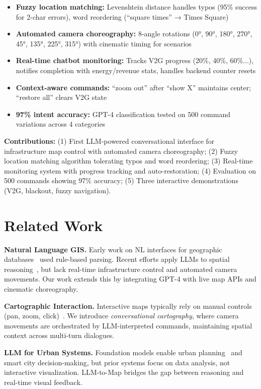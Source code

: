 \documentclass[sigconf]{acmart}
\begin{document}
\begin{itemize}
    \item \textbf{Fuzzy location matching:} Levenshtein distance handles typos (95\% success for 2-char errors), word reordering (``square times'' → Times Square)
    \item \textbf{Automated camera choreography:} 8-angle rotations (0°, 90°, 180°, 270°, 45°, 135°, 225°, 315°) with cinematic timing for scenarios
    \item \textbf{Real-time chatbot monitoring:} Tracks V2G progress (20\%, 40\%, 60\%...), notifies completion with energy/revenue stats, handles backend counter resets
    \item \textbf{Context-aware commands:} ``zoom out'' after ``show X'' maintains center; ``restore all'' clears V2G state
    \item \textbf{97\% intent accuracy:} GPT-4 classification tested on 500 command variations across 4 categories
\end{itemize}

\textbf{Contributions:}
(1) First LLM-powered conversational interface for infrastructure map control with automated camera choreography;
(2) Fuzzy location matching algorithm tolerating typos and word reordering;
(3) Real-time monitoring system with progress tracking and auto-restoration;
(4) Evaluation on 500 commands showing 97\% accuracy;
(5) Three interactive demonstrations (V2G, blackout, fuzzy navigation).

\section{Related Work}

\textbf{Natural Language GIS.} Early work on NL interfaces for geographic databases~\cite{popescu2003natural} used rule-based parsing. Recent efforts apply LLMs to spatial reasoning~\cite{roberts2023gpt,liu2023llm,gao2021geographic}, but lack real-time infrastructure control and automated camera movements. Our work extends this by integrating GPT-4 with live map APIs and cinematic choreography.

\textbf{Cartographic Interaction.} Interactive maps typically rely on manual controls (pan, zoom, click)~\cite{roth2017cartographic}. We introduce \textit{conversational cartography}, where camera movements are orchestrated by LLM-interpreted commands, maintaining spatial context across multi-turn dialogues.

\textbf{LLM for Urban Systems.} Foundation models enable urban planning~\cite{satopaa2023llm} and smart city decision-making, but prior systems focus on data analysis, not interactive visualization. LLM-to-Map bridges the gap between reasoning and real-time visual feedback.
\end{document}
